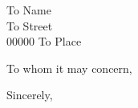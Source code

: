 \documentclass[
  fontsize=11pt,
  paper=a4,
  parskip=half,
  enlargefirstpage=on,    %
  fromalign=right,        %
  fromphone=on,           %
  fromrule=aftername,     %
  addrfield=on,           %
  backaddress=on,         %
  subject=beforeopening,  %
  locfield=narrow,        %
  foldmarks=on,           %
]{scrlttr2}
\begin{document}
  \begin{letter}{To Name\\To Street\\00000 To Place}
    \opening{To whom it may concern,}

    \blindtext

    \closing{Sincerely,}
  \end{letter}
\end{document}
